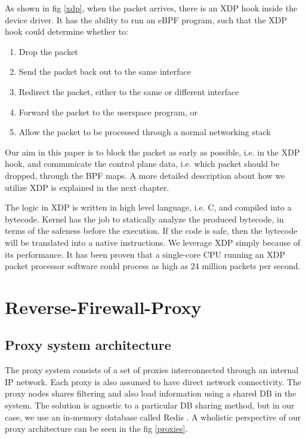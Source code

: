 \documentclass[sigplan,screen]{acmart}
\begin{document}
As shown in fig \ref{xdp}, when the packet arrives, there is an XDP hook inside the device driver. It has the ability to run an eBPF program, such that the XDP hook could determine whether to:
\begin{enumerate}
\item Drop the packet
\item Send the packet back out to the same interface
\item Redirect the packet, either to the same or different interface
\item Forward the packet to the userspace program, or
\item Allow the packet to be processed through a normal networking stack
\end{enumerate}
Our aim in this paper is to block the packet as early as possible, i.e. in the XDP hook, and communicate the control plane data, i.e. which packet should be dropped, through the BPF maps. A more detailed description about how we utilize XDP is explained in the next chapter. 

The logic in XDP is written in high level language, i.e. C, and compiled into a bytecode. Kernel has the job to statically analyze the produced bytecode, in terms of the safeness before the execution. If the code is safe, then the bytecode will be translated into a native instructions. We leverage XDP simply because of its performance. It has been proven that a single-core CPU running an XDP packet processor software could process as high as 24 million packets per second.

\section{Reverse-Firewall-Proxy}
\subsection{Proxy system architecture}
The proxy system consists of a set of proxies interconnected through an internal IP network. Each proxy is also assumed to have direct network connectivity. The proxy nodes shares filtering and also load information using a shared DB in the system. The solution is agnostic to a particular DB sharing method, but in our case, we use an in-memory database called Redis \cite{redis}. A wholistic perspective of our proxy architecture can be seen in the fig \ref{proxies}.
\end{document}
